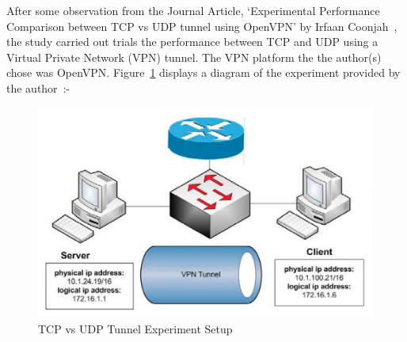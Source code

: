 \documentclass[conference]{IEEEtran}
\begin{document}
      After some observation from the Journal Article, `Experimental Performance Comparison between TCP vs UDP tunnel using OpenVPN' by Irfaan Coonjah~\cite{coonjah_experimental_2015}, the study carried out trials the performance between TCP and UDP using a Virtual Private Network (VPN) tunnel. The VPN platform the the author(s) chose was OpenVPN. Figure~\ref{fig:tcpudp-expset} displays a diagram of the experiment provided by the author~\cite{coonjah_experimental_2015}:-

      \begin{figure}[h]
        \centering
        \includegraphics[width=\columnwidth]{Figures/TCPUDP-EXPSET.png}
        \caption{TCP vs UDP Tunnel Experiment Setup~\cite{coonjah_experimental_2015}}
        \label{fig:tcpudp-expset}
      \end{figure}
\end{document}
